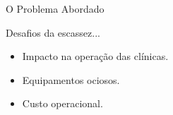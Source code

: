 



\begin{frame}{O Problema Abordado}

    \begingroup
    \begin{block}{Desafios da escassez...}
        \begin{itemize}
            \item Impacto na operação das clínicas.
            \item Equipamentos ociosos.
            \item Custo operacional.
        \end{itemize}
    \end{block}
    \endgroup

    \vspace{3cm}
\end{frame}

